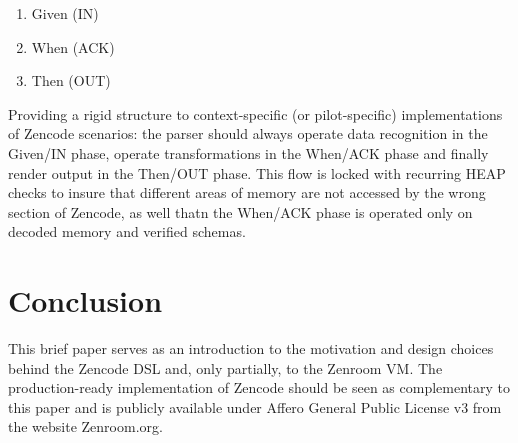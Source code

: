 \documentclass{svproc}
\begin{document}
\begin{enumerate}
\item Given (IN)
\item When (ACK)
\item Then (OUT)
\end{enumerate}

Providing a rigid structure to context-specific (or pilot-specific)
implementations of Zencode scenarios: the parser should always operate
data recognition in the Given/IN phase, operate transformations in the
When/ACK phase and finally render output in the Then/OUT phase. This
flow is locked with recurring HEAP checks to insure that different
areas of memory are not accessed by the wrong section of Zencode, as
well thatn the When/ACK phase is operated only on decoded memory and
verified schemas.

\section{Conclusion}

This brief paper serves as an introduction to the motivation and
design choices behind the Zencode DSL and, only partially, to the
Zenroom VM. The production-ready implementation of Zencode should be
seen as complementary to this paper and is publicly available under
Affero General Public License v3 from the website Zenroom.org.

%
{}

\end{document}
